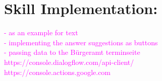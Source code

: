 \chapter{Skill Implementation: }
\label{maintwo}

\textcolor{magenta}{
- as an example for text\\
- implementing the answer suggestions as buttons\\
- passing data to the Bürgeramt terminseite\\
https://console.dialogflow.com/api-client/ \\
https://console.actions.google.com
}
